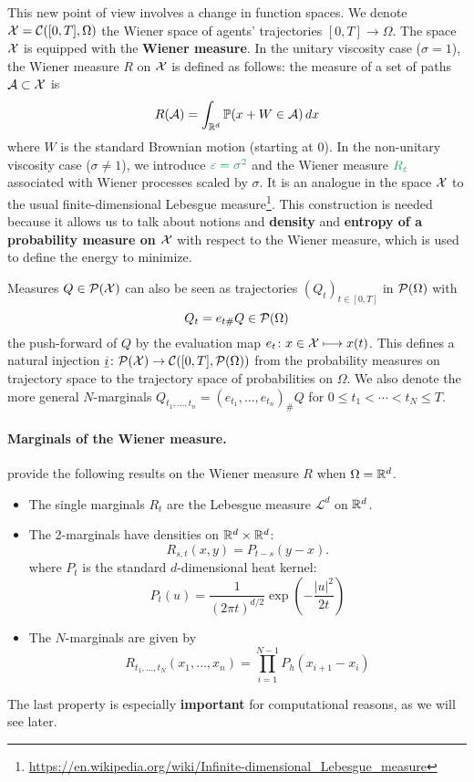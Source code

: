 \documentclass[../report.tex]{subfiles}
\begin{document}
This new point of view involves a change in function spaces. We denote $\mathcal{X} = \mathcal{C}([0,T], \Omega)$ the Wiener space of agents' trajectories $[0,T] \to\Omega$. The space $\mathcal{X}$ is equipped with the \textbf{\bluefont Wiener measure}.
In the unitary viscosity case ($\sigma = 1$), the Wiener measure $R$ on $\mathcal{X}$ is defined as follows: the measure of a set of paths $\mathcal{A} \subset \mathcal{X}$ is
\[
	R(\mathcal{A}) = \int_{\mathbb{R}^d}\mathbb{P}(x+W \in \mathcal{A})\, dx
\]
where $W$ is the standard Brownian motion (starting at $0$).
In the non-unitary viscosity case ($\sigma \neq 1$), we introduce $\greenfont\epsilon = \sigma^2$ and the Wiener measure $\greenfont R_\epsilon$ associated with Wiener processes scaled by $\sigma$.
It is an analogue in the space $\mathcal{X}$ to the usual finite-dimensional Lebesgue measure\footnote{\url{https://en.wikipedia.org/wiki/Infinite-dimensional_Lebesgue_measure}}. \cites{benamou:hal-01295299,benamou2015lagrangian} This construction is needed because it allows us to talk about notions and \textbf{density} and \textbf{entropy of a probability measure on $\mathcal{X}$} with respect to the Wiener measure, which is used to define the energy to minimize.


Measures $Q \in \mathcal{P}(\mathcal{X})$ can also be seen as trajectories $(Q_t)_{t\in[0,T]}$ in $\mathcal{P}(\Omega)$ with
\[
Q_t = e_{t\#}Q \in \mathcal{P}(\Omega)
\]
the push-forward of $Q$ by the evaluation map $e_t\colon x\in\mathcal{X}\longmapsto x(t)$. This defines a natural injection $\underline{i} \colon \mathcal{P}(\mathcal{X}) \rightarrow \mathcal{C}([0,T], \mathcal{P}(\Omega))$ from the probability measures on trajectory space to the trajectory space of probabilities on $\Omega$. We also denote the more general $N$-marginals $Q_{t_1,\ldots,t_n} = (e_{t_1},\ldots, e_{t_n})_\# Q$ for $0\leq t_1 < \cdots < t_N \leq T$.

\paragraph{Marginals of the Wiener measure.} \textcite{benamou2018entropy} provide the following results on the Wiener measure $R$ when $\Omega = \mathbb{R}^d$.
\begin{itemize}
	\item The single marginals $R_t$ are the Lebesgue measure $\mathcal{L}^d$ on $\mathbb{R}^d$.
	\item The 2-marginals have densities on $\mathbb{R}^d \times \mathbb{R}^d$:
	\begin{equation}\label{eq:2MarginWienerMeasure}
		R_{s,t}(x,y) = P_{t-s}(y-x).
	\end{equation}
	where $P_t$ is the standard $d$-dimensional heat kernel:
	\begin{equation}\label{eq:StandardDHeatKernel}
		P_t(u) =
		\frac{1}{(2\pi t)^{d/2}} \exp\left(
		-\frac{|u|^2}{2t}
		\right)
	\end{equation}
	\item The $N$-marginals are given by
	\begin{equation}
		R_{t_1,\ldots,t_N}(x_1,\ldots,x_n) = 
		\prod_{i=1}^{N-1}
		P_{h}(x_{i+1}-x_i)
	\end{equation}
\end{itemize}
The last property is especially \textbf{important} for computational reasons, as we will see later.
\end{document}
